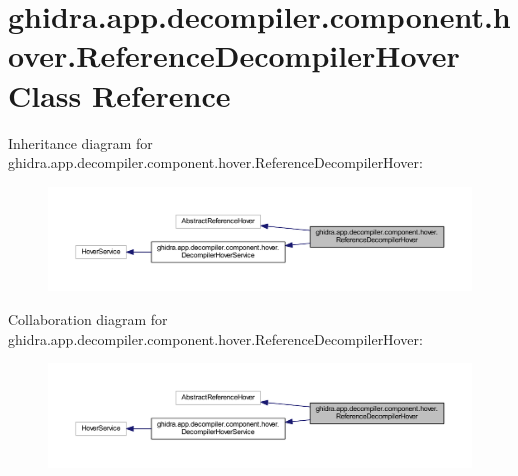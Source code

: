 \hypertarget{classghidra_1_1app_1_1decompiler_1_1component_1_1hover_1_1_reference_decompiler_hover}{}\section{ghidra.\+app.\+decompiler.\+component.\+hover.\+Reference\+Decompiler\+Hover Class Reference}
\label{classghidra_1_1app_1_1decompiler_1_1component_1_1hover_1_1_reference_decompiler_hover}


Inheritance diagram for ghidra.\+app.\+decompiler.\+component.\+hover.\+Reference\+Decompiler\+Hover\+:
\nopagebreak
\begin{figure}[H]
\begin{center}
\leavevmode
\includegraphics[width=350pt]{classghidra_1_1app_1_1decompiler_1_1component_1_1hover_1_1_reference_decompiler_hover__inherit__graph}
\end{center}
\end{figure}


Collaboration diagram for ghidra.\+app.\+decompiler.\+component.\+hover.\+Reference\+Decompiler\+Hover\+:
\nopagebreak
\begin{figure}[H]
\begin{center}
\leavevmode
\includegraphics[width=350pt]{classghidra_1_1app_1_1decompiler_1_1component_1_1hover_1_1_reference_decompiler_hover__coll__graph}
\end{center}
\end{figure}
